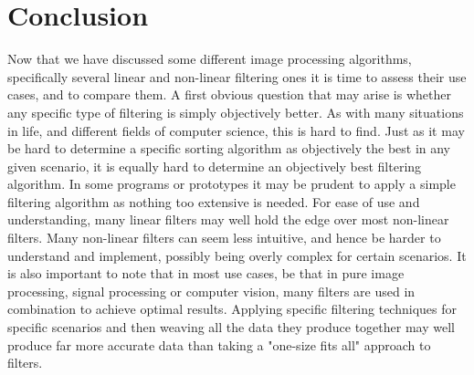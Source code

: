 \documentclass[twoside,a4paper,article]{combine}
\begin{document}
\section{Conclusion}
Now that we have discussed some different image processing algorithms, specifically several linear and non-linear filtering ones it is time to assess their use cases, and to compare them. A first obvious question that may arise is whether any specific type of filtering is simply objectively better. As with many situations in life, and different fields of computer science, this is hard to find. Just as it may be hard to determine a specific sorting algorithm as objectively the best in any given scenario, it is equally hard to determine an objectively best filtering algorithm. In some programs or prototypes it may be prudent to apply a simple filtering algorithm as nothing too extensive is needed. For ease of use and understanding, many linear filters may well hold the edge over most non-linear filters. Many non-linear filters can seem less intuitive, and hence be harder to understand and implement, possibly being overly complex for certain scenarios. It is also important to note that in most use cases, be that in pure image processing, signal processing or computer vision, many filters are used in combination to achieve optimal results. Applying specific filtering techniques for specific scenarios and then weaving all the data they produce together may well produce far more accurate data than taking a "one-size fits all" approach to filters.
\end{document}
